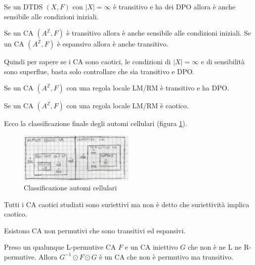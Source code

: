\begin{teorema}
    Se un DTDS $(X,F)$ con $|X|=\infty$ è transitivo e ha dei DPO allora è anche 
    sensibile alle condizioni iniziali. 
\end{teorema}

\begin{teorema} 
    Se un CA $(A^\mathbb{Z},F)$ è transitivo allora è anche sensibile alle condizioni iniziali.
    Se un CA $(A^\mathbb{Z},F)$ è espansivo allora è anche transitivo.
\end{teorema}

Quindi per sapere se i CA sono caotici, le condizioni di $|X|=\infty$ e di sensibilità sono superflue,
basta solo controllare che sia transitivo e DPO.

\begin{teorema}
    Se un CA $(A^\mathbb{Z},F)$ con una regola locale LM/RM è transitivo e ha DPO.
\end{teorema}
\begin{teorema}
    Se un CA $(A^\mathbb{Z},F)$ con una regola locale LM/RM è caotico.
\end{teorema}

Ecco la classificazione finale degli automi cellulari (figura \ref{fig:classificazione_ca}).

\begin{figure}[!hb]
    \centering
    \includegraphics[width=0.5\textwidth]{img/sistemi_complessi/classificazione_ca.png}
    \caption{Classificazione automi cellulari}
    \label{fig:classificazione_ca}
\end{figure}

\begin{nota}
    Tutti i CA caotici studiati sono suriettivi ma non è detto che suriettività 
    implica caotico.
\end{nota}

\begin{nota}
    Esistono CA non permutivi che sono transitivi ed espansivi.

    Preso un qualunque L-permutive CA $F$ e un CA iniettivo $G$ che non è ne L ne R-permutive.
    Allora $G^{-1}\odot F\odot G$ è un CA che non è permutivo ma transitivo.
\end{nota}

